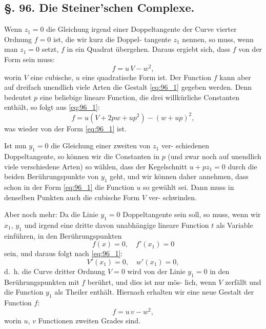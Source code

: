 \documentclass[12pt,a4paper]{article}
\theoremstyle{plain}
\theoremstyle{definition}
\theoremstyle{remark}
\begin{document}
\subsection*{§. 96. Die Steiner'schen Complexe.}

Wenn $z_1 = 0$ die Gleichung irgend einer Doppeltangente
der Curve vierter Ordnung $f = 0$ ist, die wir kurz die Doppel-
tangente $z_1$ nennen, so muss, wenn man $z_1 = 0$ setzt, $f$ in ein
Quadrat übergehen. Daraus ergiebt sich, dass $f$ von der Form
sein muss:
\begin{equation}\label{eq:96_1}
f = u\,V - w^2,
\end{equation}
worin $V$ eine cubische, $u$ eine quadratische Form ist. Der
Function $f$ kann aber auf dreifach unendlich viele Arten die
Gestalt \eqref{eq:96_1} gegeben werden. Denn bedeutet $p$ eine beliebige
lineare Function, die drei willkürliche Constanten enthält, so
folgt aus \eqref{eq:96_1}:
\begin{equation*}
f = u(V + 2pw + up^2) - (w + up)^2,
\end{equation*}
was wieder von der Form \eqref{eq:96_1} ist.

Ist nun $y_1 = 0$ die Gleichung einer zweiten von $z_1$ ver-
schiedenen Doppeltangente, so können wir die Constanten in $p$
(und zwar noch auf unendlich viele verschiedene Arten) so
wählen, dass der Kegelschnitt $u + pz_1 = 0$ durch die beiden
Berührungspunkte von $y_1$ geht, und wir können daher annehmen,
dass schon in der Form \eqref{eq:96_1} die Function $u$ so gewählt sei. Dann
muss in denselben Punkten auch die cubische Form $V$ ver-
schwinden.

Aber noch mehr: Da die Linie $y_1 = 0$ Doppeltangente
sein soll, so muss, wenn wir $x_1$, $y_1$ und irgend eine dritte davon
unabhängige lineare Function $t$ als Variable einführen, in den
Berührungspunkten
\begin{equation*}
f(x) = 0, \quad f'(x_1) = 0
\end{equation*}
sein, und daraus folgt nach \eqref{eq:96_1}:
\begin{equation*}
V'(x_1) = 0, \quad w'(x_1) = 0,
\end{equation*}
d.~h. die Curve dritter Ordnung $V = 0$ wird von der Linie $y_1 = 0$
in den Berührungspunkten mit $f$ berührt, und dies ist nur mös-
lich, wenn $V$ zerfällt und die Function $y_1$ als Theiler enthält.
Hiernach erhalten wir eine neue Gestalt der Function $f$:
\begin{equation}\label{eq:96_2}
f = u\,v - w^2,
\end{equation}
worin $u$, $v$ Functionen zweiten Grades sind.
\end{document}
